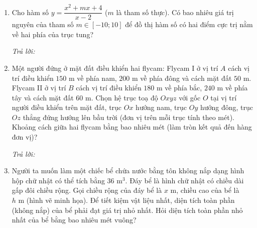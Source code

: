 \documentclass[12pt,a4paper]{article}
\newcommand{\otraloi}{\par\nobreak\smallskip\noindent\textit{Trả lời:}\quad\fbox{\rule{0pt}{11pt}\makebox[0.3cm]{}}\,\fbox{\rule{0pt}{11pt}\makebox[0.3cm]{}}\,\fbox{\rule{0pt}{11pt}\makebox[0.3cm]{}}\,\fbox{\rule{0pt}{11pt}\makebox[0.3cm]{}}}
\begin{document}
\newpage
\begin{enumerate}[start=3]
\item Cho hàm số $y=\dfrac{x^2+mx+4}{x-2}$ ($m$ là tham số thực). Có bao nhiêu giá trị nguyên của tham số $m\in[-10;10]$ để đồ thị hàm số có hai điểm cực trị nằm về hai phía của trục tung?
\otraloi

\item Một người đứng ở mặt đất điều khiển hai flycam: Flycam I ở vị trí $A$ cách vị trí điều khiển $150\text{ m}$ về phía nam, $200\text{ m}$ về phía đông và cách mặt đất $50\text{ m}$. Flycam II ở vị trí $B$ cách vị trí điều khiển $180\text{ m}$ về phía bắc, $240\text{ m}$ về phía tây và cách mặt đất $60\text{ m}$. Chọn hệ trục toạ độ $Oxyz$ với gốc $O$ tại vị trí người điều khiển trên mặt đất, trục $Ox$ hướng nam, trục $Oy$ hướng đông, trục $Oz$ thẳng đứng hướng lên bầu trời (đơn vị trên mỗi trục tính theo mét). Khoảng cách giữa hai flycam bằng bao nhiêu mét (làm tròn kết quả đến hàng đơn vị)?
\otraloi

\item Người ta muốn làm một chiếc bể chứa nước bằng tôn không nắp dạng hình hộp chữ nhật có thể tích bằng $36\text{ m}^3$. Đáy bể là hình chữ nhật có chiều dài gấp đôi chiều rộng. Gọi chiều rộng của đáy bể là $x\text{ m}$, chiều cao của bể là $h\text{ m}$ (hình vẽ minh họa). Để tiết kiệm vật liệu nhất, diện tích toàn phần (không nắp) của bể phải đạt giá trị nhỏ nhất. Hỏi diện tích toàn phần nhỏ nhất của bể bằng bao nhiêu mét vuông?
\begin{center}
\end{center}
\end{enumerate}
\end{document}
